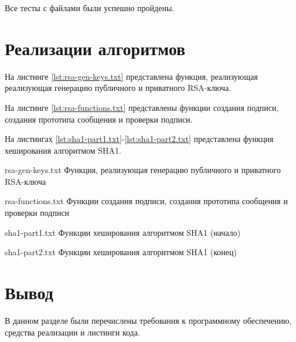 
Все тесты с файлами были успешно пройдены.

\section{Реализации алгоритмов}

На листинге \ref{lst:rsa-gen-keys.txt} представлена функция, реализующая реализующая генерацию публичного и приватного RSA-ключа.

На листинге \ref{lst:rsa-functions.txt} представлены функции создания подписи, создания прототипа сообщения и проверки подписи.

На листингах \ref{lst:sha1-part1.txt}-\ref{lst:sha1-part2.txt} представлена функция хеширования алгоритмом SHA1.

{rsa-gen-keys.txt} %
{Функция, реализующая генерацию публичного и приватного RSA-ключа} %

\clearpage 

{rsa-functions.txt} %
{Функции создания подписи, создания прототипа сообщения и проверки подписи} %

\clearpage

{sha1-part1.txt} %
{Функции хеширования алгоритмом SHA1 (начало)} %

{sha1-part2.txt} %
{Функции хеширования алгоритмом SHA1 (конец)} %

\section*{Вывод}

В данном разделе были перечислены требования к программному обеспечению, средства реализации и листинги кода.

    